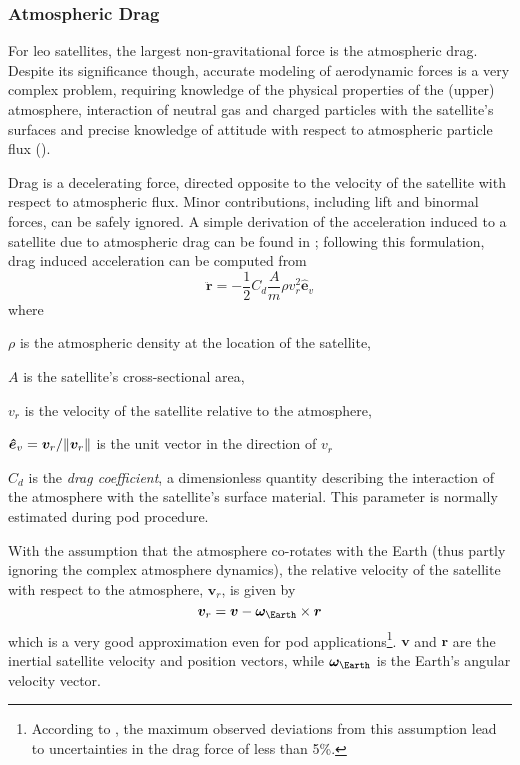 \subsubsection{Atmospheric Drag}\label{sssec:atmospheric-drag}

For \gls{leo} satellites, the largest non-gravitational force is the atmospheric 
drag. Despite its significance though, accurate modeling of aerodynamic forces 
is a very complex problem, requiring knowledge of the physical properties of the 
(upper) atmosphere, interaction of neutral gas and charged particles with the satellite's 
surfaces and precise knowledge of attitude with respect to atmospheric particle 
flux (\cite{Montenbruck2000}).

Drag is a decelerating force, directed opposite to the velocity of the satellite 
with respect to atmospheric flux. Minor contributions, including lift and binormal 
forces, can be safely ignored. A simple derivation of the acceleration induced 
to a satellite due to atmospheric drag can be found in \cite{Montenbruck2000}; 
following this formulation, drag induced acceleration can be computed from
\begin{equation}\label{eq:mont397}
  \bm{\ddot{r}} = -\frac{1}{2} C_{d} \frac{A}{m} \rho v_{r}^{2} \bm{\hat{e}}_v
\end{equation}
where
\begin{description}
  \item $\rho$ is the atmospheric density at the location of the satellite,
  \item $A$ is the satellite's cross-sectional area,
  \item $v_r$ is the velocity of the satellite relative to the atmosphere,
  \item $\bm{\hat{e}}_v = \bm{v}_r / \lVert\bm{v}_r\rVert$ is the unit vector in the 
    direction of $v_r$
  \item $C_d$ is the \emph{drag coefficient}, a dimensionless quantity describing the 
    interaction of the atmosphere with the satellite's surface material. This parameter 
    is normally estimated during \gls{pod} procedure.
\end{description}

With the assumption that the atmosphere co-rotates with the Earth (thus partly 
ignoring the complex atmosphere dynamics), the relative velocity of the satellite 
with respect to the atmosphere, $\bm{v}_r$, is given by
\begin{equation}\label{eq:mont398}
  \bm{v}_r = \bm{v} - \bm{\omega}_{\Earth} \times \bm{r}
\end{equation}
which is a very good approximation even for \gls{pod} applications\footnote{According 
to \cite{Montenbruck2000}, the maximum observed deviations from this assumption 
lead to uncertainties in the drag force of less than 5\%.}. $\bm{v}$ and $\bm{r}$ 
are the inertial satellite velocity and position vectors, while 
$\bm{\omega}_{\Earth}$ is the Earth's angular velocity vector.

